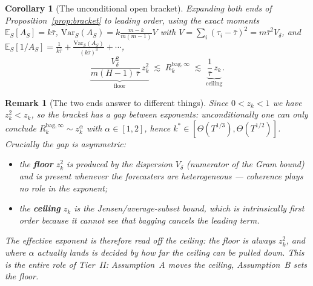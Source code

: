 \documentclass[11pt]{article}
\newcommand{\E}{\mathbb{E}}
\newcommand{\Var}{\mathrm{Var}}
\newcommand{\Rk}{R_k^{\mathrm{bag},\infty}}
\newtheorem{corollary}{Corollary}
\newtheorem{remark}{Remark}
\begin{document}
\begin{corollary}[The unconditional open bracket]\label{cor:open}
Expanding both ends of Proposition~\ref{prop:bracket} to leading order, using the exact
moments $\E_S[A_S]=k\bar\tau$, $\Var_S(A_S)=k\frac{m-k}{m(m-1)}V$ with
$V=\sum_i(\tau_i-\bar\tau)^2=m\bar\tau^2V_\delta$, and
$\E_S[1/A_S]=\frac1{k\bar\tau}+\frac{\Var_S(A_S)}{(k\bar\tau)^3}+\cdots$,
\[
  \underbrace{\frac{V_\delta^2}{m(H-1)\,\bar\tau}\,z_k^2}_{\text{floor}}
  \;\lesssim\;\Rk\;\lesssim\;
  \underbrace{\frac{1}{\bar\tau}\,z_k}_{\text{ceiling}} .
\]
\end{corollary}
\begin{remark}[The two ends answer to different things]\label{rem:asym}
Since $0<z_k<1$ we have $z_k^2<z_k$, so the bracket has a \emph{gap between exponents}:
unconditionally one can only conclude $\Rk\sim z_k^\alpha$ with $\alpha\in[1,2]$, hence
$k^\ast\in[\Theta(T^{1/3}),\Theta(T^{1/2})]$. Crucially the gap is asymmetric:
\begin{itemize}
\item the \textbf{floor} $z_k^2$ is produced by the \emph{dispersion} $V_\delta$
  (numerator of the Gram bound) and is present whenever the forecasters are
  heterogeneous --- coherence plays no role in the exponent;
\item the \textbf{ceiling} $z_k$ is the Jensen/average-subset bound, which is
  intrinsically first order because it cannot see that bagging cancels the leading term.
\end{itemize}
The effective exponent is therefore read off the \emph{ceiling}: the floor is always
$z_k^2$, and where $\alpha$ actually lands is decided by how far the ceiling can be pulled
down. This is the entire role of Tier~II: \emph{Assumption~A moves the ceiling,
Assumption~B sets the floor.}
\end{remark}
\end{document}
